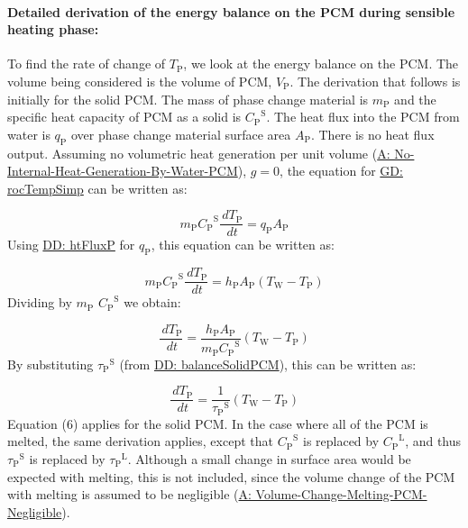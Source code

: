 \documentclass[12pt]{article}
\begin{document}
\paragraph{Detailed derivation of the energy balance on the PCM during sensible heating phase:}
\label{IM:eBalanceOnPCMDeriv}
To find the rate of change of ${T_{\text{P}}}$, we look at the energy balance on the PCM. The volume being considered is the volume of PCM, ${V_{\text{P}}}$. The derivation that follows is initially for the solid PCM. The mass of phase change material is ${m_{\text{P}}}$ and the specific heat capacity of PCM as a solid is ${{C_{\text{P}}}^{\text{S}}}$. The heat flux into the PCM from water is ${q_{\text{P}}}$ over phase change material surface area ${A_{\text{P}}}$. There is no heat flux output. Assuming no volumetric heat generation per unit volume (\hyperref[assumpNIHGBWP]{A: No-Internal-Heat-Generation-By-Water-PCM}), $g=0$, the equation for \hyperref[GD:rocTempSimp]{GD: rocTempSimp} can be written as:

\begin{displaymath}
{m_{\text{P}}} {{C_{\text{P}}}^{\text{S}}} \frac{\,d{T_{\text{P}}}}{\,dt}={q_{\text{P}}} {A_{\text{P}}}
\end{displaymath}
Using \hyperref[DD:htFluxP]{DD: htFluxP} for ${q_{\text{P}}}$, this equation can be written as:

\begin{displaymath}
{m_{\text{P}}} {{C_{\text{P}}}^{\text{S}}} \frac{\,d{T_{\text{P}}}}{\,dt}={h_{\text{P}}} {A_{\text{P}}} \left({T_{\text{W}}}-{T_{\text{P}}}\right)
\end{displaymath}
Dividing by ${m_{\text{P}}}$ ${{C_{\text{P}}}^{\text{S}}}$ we obtain:

\begin{displaymath}
\frac{\,d{T_{\text{P}}}}{\,dt}=\frac{{h_{\text{P}}} {A_{\text{P}}}}{{m_{\text{P}}} {{C_{\text{P}}}^{\text{S}}}} \left({T_{\text{W}}}-{T_{\text{P}}}\right)
\end{displaymath}
By substituting ${{τ_{\text{P}}}^{\text{S}}}$ (from \hyperref[DD:balanceSolidPCM]{DD: balanceSolidPCM}), this can be written as:

\begin{displaymath}
\frac{\,d{T_{\text{P}}}}{\,dt}=\frac{1}{{{τ_{\text{P}}}^{\text{S}}}} \left({T_{\text{W}}}-{T_{\text{P}}}\right)
\end{displaymath}
Equation (6) applies for the solid PCM. In the case where all of the PCM is melted, the same derivation applies, except that ${{C_{\text{P}}}^{\text{S}}}$ is replaced by ${{C_{\text{P}}}^{\text{L}}}$, and thus ${{τ_{\text{P}}}^{\text{S}}}$ is replaced by ${{τ_{\text{P}}}^{\text{L}}}$. Although a small change in surface area would be expected with melting, this is not included, since the volume change of the PCM with melting is assumed to be negligible (\hyperref[assumpVCMPN]{A: Volume-Change-Melting-PCM-Negligible}).
\end{document}
